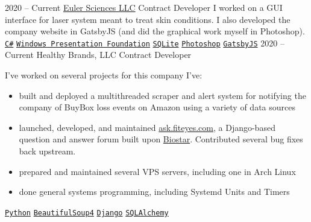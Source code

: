 \documentclass[9pt]{developercv} %
\begin{document}


\begin{entrylist}
    \entry
        {2020 -- Current}
        {\href{https://euler-sci.com}{Euler Sciences LLC}}
        {Contract Developer}
        {
            I worked on a GUI interface for laser system meant to treat skin
            conditions. I also developed the company website in GatsbyJS (and
            did the graphical work myself in Photoshop).
        \\
        \texttt{{\href{https://en.wikipedia.org/wiki/C_Sharp_(programming_language)}{C\#}}}\slashsep
        \texttt{{\href{https://en.wikipedia.org/wiki/Windows_Presentation_Foundation}{Windows Presentation Foundation}}}\slashsep
        \texttt{{\href{https://www.sqlite.org/index.html}{SQLite}}}\slashsep
        \texttt{{\href{https://www.adobe.com/products/photoshop.html}{Photoshop}}}\slashsep
        \texttt{{\href{https://www.gatsbyjs.org/}{GatsbyJS}}}
        }
    \entry
        {2020 -- Current}
        {Healthy Brands, LLC}
        {Contract Developer}
        {
            I've worked on several projects for this company I've:
            \begin{itemize}[leftmargin=*, noitemsep]
                \item built and deployed a multithreaded scraper and alert system for notifying the company of BuyBox loss events on Amazon using a variety of data sources
                \item launched, developed, and maintained {\href{https://ask.fiteyes.com}{ask.fiteyes.com}}, a Django-based question and answer forum built upon {\href{https://github.com/ialbert/biostar-central}{Biostar}}.  Contributed several bug fixes back upstream.
                \item prepared and maintained several VPS servers, including one in Arch Linux
                \item done general systems programming, including Systemd Units and Timers
            \end{itemize}
        \texttt{{\href{https://www.python.org/}{Python}}}\slashsep
        \texttt{{\href{https://www.crummy.com/software/BeautifulSoup/bs4/doc/}{BeautifulSoup4}}}\slashsep
        \texttt{{\href{https://www.djangoproject.com/}{Django}}}\slashsep
        \texttt{{\href{https://www.sqlalchemy.org/}{SQLAlchemy}}}\slashsep
}
\end{entrylist}
\end{document}
